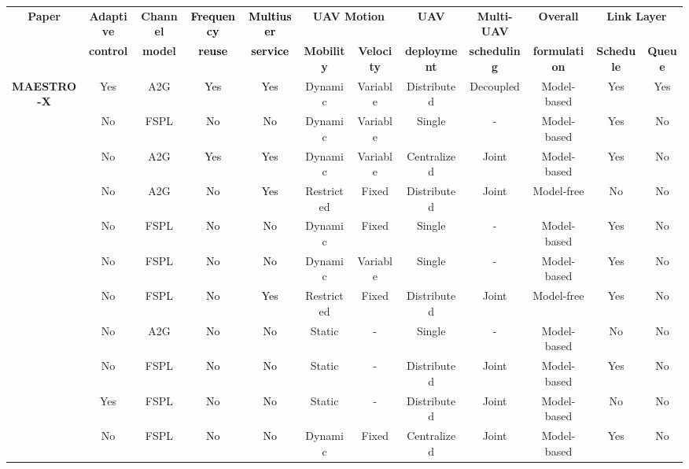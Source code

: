 \documentclass[10pt, twocolumn]{IEEEtran}
\theoremstyle{plain}
\theoremstyle{definition}
\theoremstyle{remark}
\newcommand\hlt[1]{\textcolor{black}{#1}}
\begin{document}
\begin{table}[t]
\begin{center}
\scriptsize
    \begin{tabular}{|*{12}{c|}}
    \hline
    	\multirow{ 2}{*}{{\bf{Paper}}} &
    	{\bf{Adaptive}} &
	\bf{Channel} &
    	\bf{\hlt{Frequency}} &
   	\bf{\hlt{Multiuser}} &
	\multicolumn{2}{c|}{\bf{UAV Motion}} &
    	\bf{UAV} &
    	\bf{Multi-UAV} &
	\bf{Overall} &
	\multicolumn{2}{c|}{\bf{Link Layer}}\\
		&
    	\bf{control} &
	\bf{model} &
    	\bf{\hlt{reuse}} &
   	\bf{\hlt{service}} &
	\bf{Mobility} & \bf{Velocity} &
    	\bf{deployment} &
    	\bf{scheduling} &
	\bf{formulation} &
	\bf{Schedule} & \bf{Queue}\\
    \hline
	{\tiny\bf MAESTRO-X} & Yes & A2G & \hlt{Yes} & \hlt{Yes} & Dynamic & Variable & Distributed & Decoupled & Model-based & Yes & Yes\\
	\hline
    \cite{SCA} & No & FSPL & \hlt{No} & \hlt{No} & Dynamic & Variable & Single & - & Model-based & Yes & No\\
    \hline
    \cite{CSCA-ADMM} & No & A2G & \hlt{Yes} & \hlt{Yes} & Dynamic & Variable & Centralized & Joint & Model-based & Yes & No\\
    \hline
    \cite{DDQN} & No & A2G & \hlt{No} & \hlt{Yes} & Restricted & Fixed & Distributed & Joint & Model-free & No & No\\
    \hline
    \cite{PAoI} & No & FSPL & \hlt{No} & \hlt{No} & Dynamic & Fixed & Single & - & Model-based & Yes & No\\
    \hline
    \cite{MEC-CVX} & No & FSPL & \hlt{No} & \hlt{No} & Dynamic & Variable & Single & - & Model-based & Yes & No\\
    \hline
    \cite{MEC-DDPG} & No & FSPL & \hlt{No} & \hlt{Yes} & Restricted & Fixed & Distributed & Joint & Model-free & Yes & No\\
    \hline
    \cite{LoSMap} & No & A2G & \hlt{No} & \hlt{No} & Static & - & Single & - & Model-based & No & No\\
    \hline
    \cite{GameTheory} & No & FSPL &\hlt{No} & \hlt{No} &  Static & - & Distributed & Joint & Model-based & Yes & No\\
    \hline
    \cite{UAVDynamicCoverage} & Yes & FSPL & \hlt{No} & \hlt{No} & Static & - & Distributed & Joint & Model-based & No & No\\
    \hline
    \cite{JointTrajectoryDesign} & No & FSPL & \hlt{No} & \hlt{No} & Dynamic & Fixed & Centralized & Joint & Model-based & Yes & No\\

\end{tabular}
\end{center}
\end{table}
\end{document}
